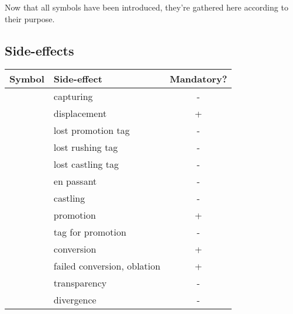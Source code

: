 Now that all symbols have been introduced, they're gathered here according to their purpose.

\subsection*{Side-effects}
\label{sec:Appendix/Summary/Side-effects}

\begin{table}[!h]
\centering
\begin{tabular}{ rlc }
\toprule %
\textbf{Symbol}             & \textbf{Side-effect}          & \textbf{Mandatory?}   \\
\midrule %
\alg{*}                     & capturing                     & -                     \\
\alg{<}                     & displacement                  & +                     \\
\cmidrule{1-3} %
\alg{==}                    & lost promotion tag            & -                     \\
\alg{::}                    & lost rushing tag              & -                     \\
\alg{\&\&}                  & lost castling tag             & -                     \\
\cmidrule{1-3} %
\alg{:}                     & en passant                    & -                     \\
\alg{\&}                    & castling                      & -                     \\
\alg{=}                     & promotion                     & +                     \\
\alg{=}                     & tag for promotion             & -                     \\
\alg{\%}                    & conversion                    & +                     \\
\alg{\%\%}                  & failed conversion, oblation   & +                     \\
\alg{\^{}}                  & transparency                  & -                     \\
\alg{/}                     & divergence                    & -                     \\

\end{tabular}
\end{table}
